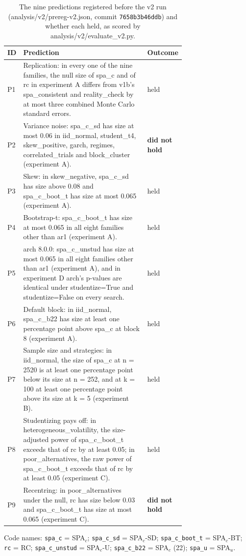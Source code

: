 \begin{table}[t]
\centering
\small
\caption{The nine predictions registered before the v2 run (analysis/v2/prereg-v2.json, commit \texttt{7658b3b46ddb}) and whether each held, as scored by analysis/v2/evaluate\_v2.py.}
\label{tab:predictions}
\begin{tabular}{lp{0.72\linewidth}l}
\toprule
ID & Prediction & Outcome \\
\midrule
P1 & Replication: in every one of the nine families, the null size of spa\_c and of rc in experiment A differs from v1b's spa\_consistent and reality\_check by at most three combined Monte Carlo standard errors. & held \\
P2 & Variance noise: spa\_c\_sd has size at most 0.06 in iid\_normal, student\_t4, skew\_positive, garch, regimes, correlated\_trials and block\_cluster (experiment A). & \textbf{did not hold} \\
P3 & Skew: in skew\_negative, spa\_c\_sd has size above 0.08 and spa\_c\_boot\_t has size at most 0.065 (experiment A). & held \\
P4 & Bootstrap-t: spa\_c\_boot\_t has size at most 0.065 in all eight families other than ar1 (experiment A). & held \\
P5 & arch 8.0.0: spa\_c\_unstud has size at most 0.065 in all eight families other than ar1 (experiment A), and in experiment D arch's p-values are identical under studentize=True and studentize=False on every search. & held \\
P6 & Default block: in iid\_normal, spa\_c\_b22 has size at least one percentage point above spa\_c at block 8 (experiment A). & held \\
P7 & Sample size and strategies: in iid\_normal, the size of spa\_c at n = 2520 is at least one percentage point below its size at n = 252, and at k = 100 at least one percentage point above its size at k = 5 (experiment B). & held \\
P8 & Studentizing pays off: in heterogeneous\_volatility, the size-adjusted power of spa\_c\_boot\_t exceeds that of rc by at least 0.05; in poor\_alternatives, the raw power of spa\_c\_boot\_t exceeds that of rc by at least 0.05 (experiment C). & held \\
P9 & Recentring: in poor\_alternatives under the null, rc has size below 0.03 and spa\_c\_boot\_t has size at most 0.065 (experiment C). & \textbf{did not hold} \\
\bottomrule
\end{tabular}
\par\smallskip\begin{minipage}{0.97\linewidth}\footnotesize Code names: \texttt{spa\_c} = SPA$_c$; \texttt{spa\_c\_sd} = SPA$_c$-SD; \texttt{spa\_c\_boot\_t} = SPA$_c$-BT; \texttt{rc} = RC; \texttt{spa\_c\_unstud} = SPA$_c$-U; \texttt{spa\_c\_b22} = SPA$_c$ (22); \texttt{spa\_u} = SPA$_u$.\end{minipage}
\end{table}


